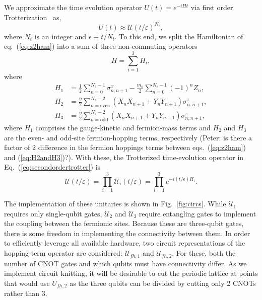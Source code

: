 \documentclass[twocolumn,superscriptaddress,showpacs,nofootinbib,notitlepage,preprintnumbers,secnumarabic,amssymb, floatfix, nobibnotes, aps, prd]{revtex4-2}
\begin{document}
We approximate the time evolution operator $U(t)=e^{-iHt}$ via first order Trotterization~\cite{trotter1959product,Suzuki:1985,PhysRevX.11.011020} as,
\begin{equation}
    \label{eq:secondordertrotter}
    U(t) \approx \mathcal{U}(t/\varepsilon)^{N_t} ,
\end{equation}
where $N_t$ is an integer and $\epsilon \equiv t/N_t$.
To this end, we split the Hamiltonian of eq.~(\ref{eq:z2ham}) into a sum of three non-commuting operators
\begin{equation}
    H = \sum_{i=1}^3 H_i,
\end{equation} 
where 
\begin{equation}\label{eq:H2andH3}
\begin{split}
    H_1 &=  \frac{1}{2} \sum_{n=0}^{N_s - 1} \sigma^{x}_{n,n+1} - \frac{m_0}{2} \sum_{n=0}^{N_s - 1} (-1)^n Z_{n}, \\
    H_2 &=  \frac{\eta}{2} \sum_{n=\text{even}}^{N_s-2}(X_n X_{n + 1} + Y_{n} Y_{n + 1})\sigma^{z}_{n,n+1},\\
    H_3 &=  \frac{\eta}{2} \sum_{n=\text{odd}}^{N_s-2}(X_n X_{n + 1} + Y_{n} Y_{n + 1})\sigma^{z}_{n,n+1},
\end{split}
\end{equation}
where $H_1$ comprises the gauge-kinetic and fermion-mass terms and $H_2$ and $H_3$ are the even- and odd-site fermion-hopping terms, respectively {\color{red}(Peter: is there a factor of $2$ difference in the fermion hoppings terms between eqs.~(\ref{eq:z2ham}) and (\ref{eq:H2andH3})?)}. 
With these, the Trotterized time-evolution operator in Eq.~(\ref{eq:secondordertrotter}) is 
\begin{equation}
    \mathcal{U}(t/\varepsilon) = \prod_{i=1}^3 \mathcal{U}_i(t/\varepsilon)=\prod_{i=1}^3  e^{-i(t/\epsilon) H_i}.
\end{equation}


The implementation of these unitaries is shown in Fig.~\ref{fig:circs}. 
While $\mathcal{U}_1$ requires only single-qubit gates, $\mathcal{U}_{2}$ and $\mathcal{U}_{3}$ require entangling gates to implement the coupling between the fermionic sites.  
Because these are three-qubit gates, there is some freedom in implementing the connectivity between them. 
In order to efficiently leverage all available hardware, two circuit representations of the hopping-term operator are considered: $\mathcal{U}_{fh,1}$ and $\mathcal{U}_{fh,2}$. 
For these, both the number of CNOT gates and which qubits must have connectivity differ. 
As we implement circuit knitting, it will be desirable to cut the periodic lattice at points that would use $U_{fh,2}$ as the three qubits can be divided by cutting only 2 CNOTs rather than 3.
\end{document}
